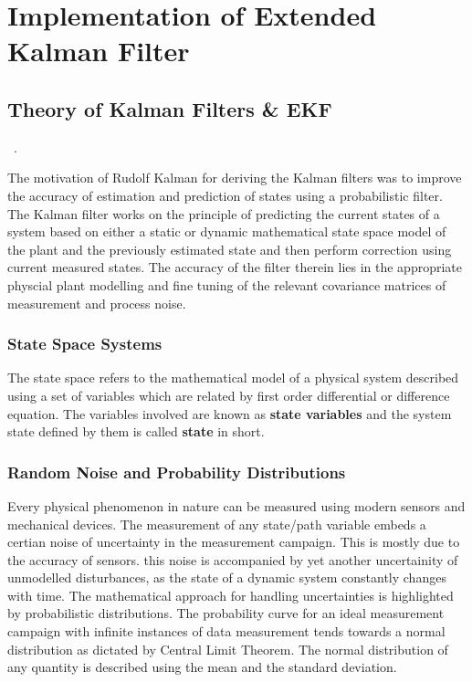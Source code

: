 \chapter{Implementation of Extended Kalman Filter}

\section{Theory of Kalman Filters \& EKF}~\cite{CC17}.

The motivation of Rudolf Kalman for deriving the Kalman filters was to improve the accuracy of estimation and prediction of states using a probabilistic filter. The Kalman filter works on the principle of predicting the current states of a system based on either a static or dynamic mathematical state space model of the plant and the previously estimated state and then perform correction using current measured states. The accuracy of the filter therein lies in the appropriate physcial plant modelling and fine tuning of the relevant covariance matrices of measurement and process noise.

\subsection{State Space Systems}
The state space refers to the mathematical model of a physical system described using a set of variables which are related by first order differential or difference equation. The variables involved are known as \textbf{state variables} and the system state defined by them is called \textbf{state} in short.

\subsection{Random Noise and Probability Distributions}

Every physical phenomenon in nature can be measured using modern sensors and mechanical devices. The measurement of any state/path variable embeds a certian noise of uncertainty in the measurement campaign. This is mostly due to the accuracy of sensors. this noise is accompanied by yet another uncertainity of unmodelled disturbances, as the state of a dynamic system constantly changes with time. The mathematical approach for handling uncertainties is highlighted by probabilistic distributions. The probability curve for an ideal measurement campaign with infinite instances of data measurement tends towards a normal distribution as dictated by Central Limit Theorem. The normal distribution of any quantity is described using the mean and the standard deviation.

